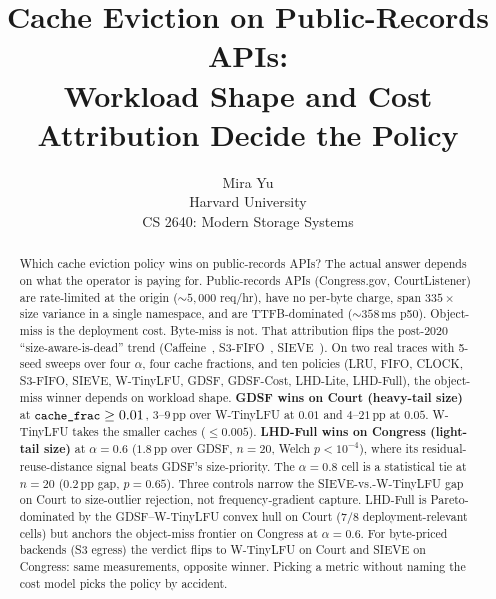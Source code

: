 \documentclass[letterpaper,twocolumn,10pt]{article}
\newcommand{\code}[1]{\texttt{\small #1}}
\begin{document}
\date{}
\title{\Large \bf Cache Eviction on Public-Records APIs:\\
Workload Shape and Cost Attribution Decide the Policy}
\author{
{\rm Mira Yu}\\
Harvard University \\
CS 2640: Modern Storage Systems
}
\maketitle
\begin{abstract}
Which cache eviction policy wins on public-records APIs? The
actual answer depends on what the operator is paying for.
Public-records APIs (Congress.gov, CourtListener) are rate-limited
at the origin ($\sim 5{,}000$ req/hr), have no per-byte charge,
span $335\times$ size variance in a single namespace, and are
TTFB-dominated ($\sim 358$\,ms p50). Object-miss is the deployment
cost. Byte-miss is not. That attribution flips the post-2020
``size-aware-is-dead'' trend
(Caffeine~\cite{caffeine2024}, S3-FIFO~\cite{yang2023fifo},
SIEVE~\cite{zhang2024sieve}).
On two real traces with 5-seed sweeps over four $\alpha$, four cache
fractions, and ten policies (LRU, FIFO, CLOCK, S3-FIFO, SIEVE,
W-TinyLFU, GDSF, GDSF-Cost, LHD-Lite, LHD-Full), the object-miss
winner depends on workload shape. \textbf{GDSF wins on Court
(heavy-tail size)} at $\code{cache\_frac} \geq 0.01$, $3$--$9$\,pp
over W-TinyLFU at $0.01$ and $4$--$21$\,pp at $0.05$. W-TinyLFU
takes the smaller caches ($\leq 0.005$). \textbf{LHD-Full wins on
Congress (light-tail size)} at $\alpha = 0.6$ ($1.8$\,pp over GDSF,
$n{=}20$, Welch $p<10^{-4}$), where its residual-reuse-distance
signal beats GDSF's size-priority. The $\alpha=0.8$ cell is a
statistical tie at $n{=}20$ ($0.2$\,pp gap, $p=0.65$). Three
controls narrow the SIEVE-vs.-W-TinyLFU gap on Court to size-outlier
rejection, not frequency-gradient capture. LHD-Full is
Pareto-dominated by the GDSF--W-TinyLFU convex hull on Court ($7/8$
deployment-relevant cells) but anchors the object-miss frontier on
Congress at $\alpha = 0.6$.
For byte-priced backends (S3 egress) the verdict flips to W-TinyLFU
on Court and SIEVE on Congress: same measurements, opposite winner.
Picking a metric without naming the cost model picks the policy by
accident.
\end{abstract}
\end{document}
